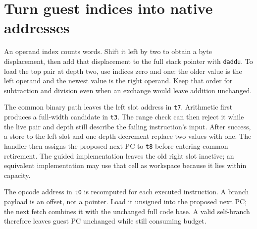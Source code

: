 \section{Turn guest indices into native addresses}\label{vm-addresses}
An operand index counts words. Shift it left by two to obtain a byte displacement,
then add that displacement to the full stack pointer with \texttt{daddu}. To load
the top pair at depth two, use indices zero and one: the older value is the left
operand and the newest value is the right operand. Keep that order for subtraction
and division even when an exchange would leave addition unchanged.

The common binary path leaves the left slot address in \texttt{t7}. Arithmetic
first produces a full-width candidate in
\texttt{t3}. The range check can then reject it while the live pair and depth still
describe the failing instruction's input. After success, a store to the left slot
and one depth decrement replace two values with one. The handler then assigns the
proposed next PC to \texttt{t8} before entering common retirement. The guided implementation
leaves the old right slot inactive; an equivalent implementation may use that cell
as workspace because it lies within capacity.

The opcode address in \texttt{t0} is recomputed for each executed instruction. A
branch payload is an offset, not a pointer. Load it unsigned into the proposed next
PC; the next fetch combines it with the unchanged full code base. A valid self-branch
therefore leaves guest PC unchanged while still consuming budget.
